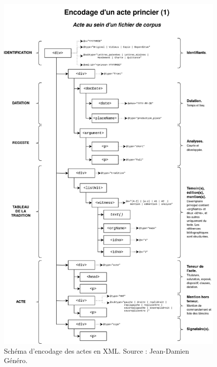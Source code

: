 \begin{figure}[H]
    \centering
    \includegraphics[scale=0.18]{front/images/encodage_actes_corpus.jpg}
    \caption{Schéma d'encodage des actes en XML. Source : Jean-Damien Généro.}
    \label{fig:encodage}
\end{figure}
\newpage 


